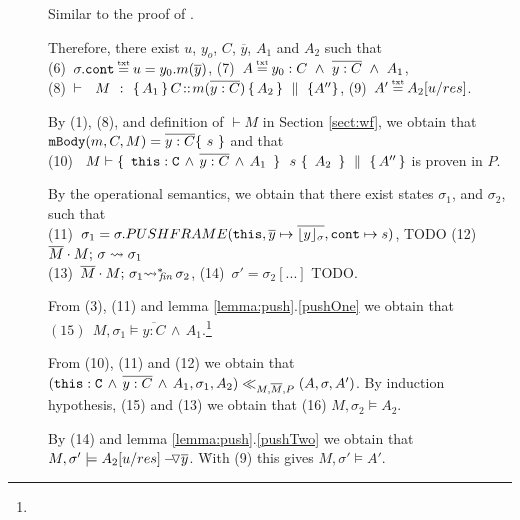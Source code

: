 \begin{description}
\item[{}] Similar to the proof of  {}. 


\item[ {}]

Therefore, there exist $u$, $y_o$, $C$, $\overline y$,  $A_1$ and $A_2$ such that \\
(6)\ $\sigma.\prg{cont}\txteq u=y_0.m(\overline y)$,   \hspace{2cm}
 (7)\ $A \txteq y_0:C  \ \wedge\ \overline {y:C}\ \wedge \  A_1$, 
\\ 
 (8)\ $\promises  M {\mprepostN {A_1}{C}{m}{y}{C}{A_2} {A''}}$,    \hspace{1cm}
 (9)\ $A' \txteq  A_2[ u/res]$. 

By (1), (8), and definition of $\vdash M$ in Section \ref{sect:wf}, we obtain that   $\prg{mBody}(m,C,M)=\overline{y:C}\{\  s \ \}$ and that\\
(10) \  $M \vdash  \quadruple { \ \prg{this}:\prg{C}\, \wedge\, \overline{y:C}\, \wedge\, A_1\  } {\ s\ } {\ A_2\ } {A''}$ is proven in $P$.
 
 By the operational semantics, we obtain that there exist states $\sigma_1$, and $\sigma_2$, such that \\
 (11)\ $\sigma_1=\sigma.PUSHFRAME(\prg{this}, {\overline y} \mapsto \overline{\interpret {\sigma} y},\prg{cont} \mapsto s) $, TODO   \hspace{1cm}
   (12)\ $\leadstoBounded  {\Mtwo\cdot M}  {\sigma}  {\sigma_1}$ \\
 (13)\ $\leadstoBoundedStarFin {\Mtwo\cdot M}  {\sigma_1}  {\sigma_2}$,   \hspace{3cm}
 (14)\ $\sigma'=\sigma_2[...]$ TODO.
 
 From (3), (11) and lemma \ref{lemma:push}.\ref{pushOne}  we obtain that \ \ \  $ (15) \ \ M, \sigma_1 \models \overline{y:C}\, \wedge\, A_1$.\footnote{}
 
 From (10), (11) and (12) we obtain that $( \prg{this}:\prg{C}\, \wedge\, \overline{y:C}\, \wedge\, A_1,\sigma_1,A_2) \ll_{M,\Mtwo,P} (A,\sigma,A')$. By induction hypothesis, (15) and (13) we obtain that (16) $M,\sigma_2 \models A_2$.
 
 By (14) and lemma  \ref{lemma:push}.\ref{pushTwo}  we obtain that 
\ \ $M,\sigma' \models \PushAS  {y} {A_2[ u/res]}$. \. With (9) this gives $M,\sigma' \models A'$.


\end{description}
